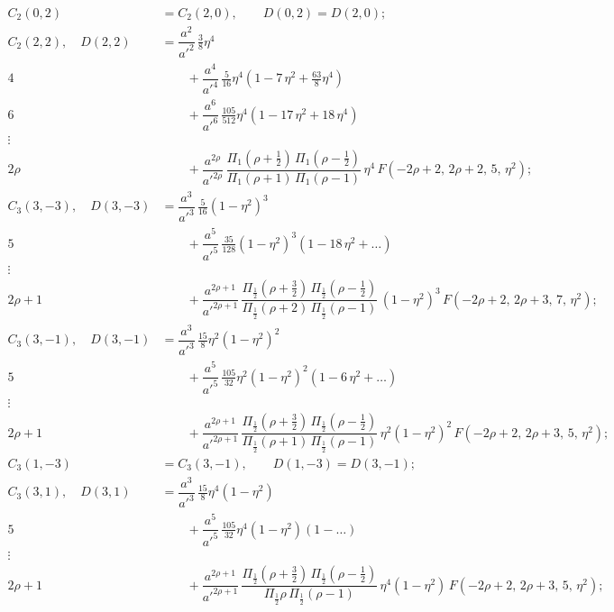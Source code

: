 \documentclass[12pt,a4paper]{article}
\theoremstyle{plain}
\begin{document}
\newpage
{}
\begin{align*}
C_{2}(0,2)&= C_{2}(2,0),\qquad D(0,2)=D(2,0);\\[0.5em]
C_{2}(2,2),\quad D(2,2) &= \dfrac{a^{2}}{a'^{2}}\,\tfrac{3}{8}\eta^{4}\\
4 &\qquad +\dfrac{a^{4}}{a'^{4}}\,\tfrac{5}{16}\eta^{4}(1-7\,\eta^{2}+\tfrac{63}{8}\eta^{4})\\
6 &\qquad +\dfrac{a^{6}}{a'^{6}}\,\tfrac{105}{512}\eta^{4}(1-17\,\eta^{2}+18\,\eta^{4})\\
\vdots &\\
2\rho &\qquad +\dfrac{a^{2\rho}}{a'^{2\rho}}\,\dfrac{\Pi_{1}(\rho+\tfrac{1}{2})\,\Pi_{1}(\rho-\tfrac{1}{2})}{\Pi_{1}(\rho+1)\,\Pi_{1}(\rho-1)}\,\eta^{4}\,F(-2\rho+2,\,2\rho+2,\,5,\,\eta^{2});\\[1em]
C_{3}(3,-3),\quad D(3,-3) &= \dfrac{a^{3}}{a'^{3}}\,\tfrac{5}{16}(1-\eta^{2})^{3}\\
5 &\qquad +\dfrac{a^{5}}{a'^{5}}\,\tfrac{35}{128}(1-\eta^{2})^{3}(1-18\,\eta^{2}+\ldots)\\
\vdots &\\
2\rho+1 &\qquad +\dfrac{a^{2\rho+1}}{a'^{2\rho+1}}\,\dfrac{\Pi_{\frac{1}{2}}(\rho+\tfrac{3}{2})\,\Pi_{\frac{1}{2}}(\rho-\tfrac{1}{2})}{\Pi_{\frac{1}{2}}(\rho+2)\,\Pi_{\frac{1}{2}}(\rho-1)}\,(1-\eta^{2})^{3}\,F(-2\rho+2,\,2\rho+3,\,7,\,\eta^{2});\\[1em]
C_{3}(3,-1),\quad D(3,-1) &= \dfrac{a^{3}}{a'^{3}}\,\tfrac{15}{8}\eta^{2}(1-\eta^{2})^{2}\\
5 &\qquad +\dfrac{a^{5}}{a'^{5}}\,\tfrac{105}{32}\eta^{2}(1-\eta^{2})^{2}(1-6\,\eta^{2}+\ldots)\\
\vdots &\\
2\rho+1 &\qquad +\dfrac{a^{2\rho+1}}{a'^{2\rho+1}}\,\dfrac{\Pi_{\frac{1}{2}}(\rho+\tfrac{3}{2})\,\Pi_{\frac{1}{2}}(\rho-\tfrac{1}{2})}{\Pi_{\frac{1}{2}}(\rho+1)\,\Pi_{\frac{1}{2}}(\rho-1)}\,\eta^{2}(1-\eta^{2})^{2}\,F(-2\rho+2,\,2\rho+3,\,5,\,\eta^{2});\\[1em]
C_{3}(1,-3)&= C_{3}(3,-1),\qquad D(1,-3)=D(3,-1);\\[0.5em]
C_{3}(3,1),\quad D(3,1) &= \dfrac{a^{3}}{a'^{3}}\,\tfrac{15}{8}\eta^{4}(1-\eta^{2})\\
5 &\qquad +\dfrac{a^{5}}{a'^{5}}\,\tfrac{105}{32}\eta^{4}(1-\eta^{2})(1-\ldots)\\
\vdots &\\
2\rho+1 &\qquad +\dfrac{a^{2\rho+1}}{a'^{2\rho+1}}\,\dfrac{\Pi_{\frac{1}{2}}(\rho+\tfrac{3}{2})\,\Pi_{\frac{1}{2}}(\rho-\tfrac{1}{2})}{\Pi_{\frac{1}{2}}\rho\,\Pi_{\frac{1}{2}}(\rho-1)}\,\eta^{4}(1-\eta^{2})\,F(-2\rho+2,\,2\rho+3,\,5,\,\eta^{2});\\[1em]

\end{align*}
\end{document}
